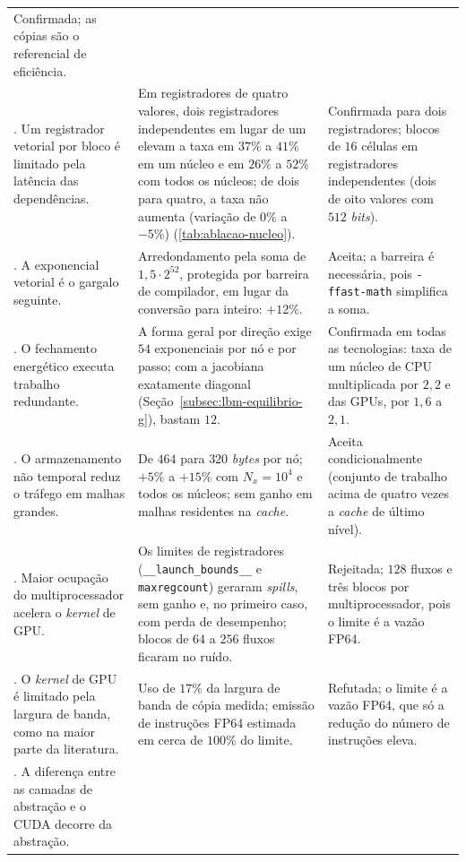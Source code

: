 \begin{longtable}{>{\raggedright\arraybackslash}p{3.2cm}>{\raggedright\arraybackslash}p{7.6cm}>{\raggedright\arraybackslash}p{4.3cm}}
        Confirmada; as cópias são o referencial de eficiência. \\
    6. Um registrador vetorial por bloco é limitado pela latência das dependências. &
        Em registradores de quatro valores, dois registradores independentes em lugar de um elevam a taxa em $37\%$ a $41\%$ em um núcleo e em $26\%$ a $52\%$ com todos os núcleos; de dois para quatro, a taxa não aumenta (variação de $0\%$ a $-5\%$) (\autoref{tab:ablacao-nucleo}). &
        Confirmada para dois registradores; blocos de $16$ células em registradores independentes (dois de oito valores com $512$ \textit{bits}). \\
    7. A exponencial vetorial é o gargalo seguinte. &
        Arredondamento pela soma de $1{,}5 \cdot 2^{52}$, protegida por barreira de compilador, em lugar da conversão para inteiro: $+12\%$. &
        Aceita; a barreira é necessária, pois \texttt{-ffast-math} simplifica a soma. \\
    8. O fechamento energético executa trabalho redundante. &
        A forma geral por direção exige $54$ exponenciais por nó e por passo; com a jacobiana exatamente diagonal (Seção~\ref{subsec:lbm-equilibrio-g}), bastam $12$. &
        Confirmada em todas as tecnologias: taxa de um núcleo de CPU multiplicada por $2{,}2$ e das GPUs, por $1{,}6$ a $2{,}1$. \\
    9. O armazenamento não temporal reduz o tráfego em malhas grandes. &
        De $464$ para $320$ \textit{bytes} por nó; $+5\%$ a $+15\%$ com $N_x = 10^4$ e todos os núcleos; sem ganho em malhas residentes na \textit{cache}. &
        Aceita condicionalmente (conjunto de trabalho acima de quatro vezes a \textit{cache} de último nível). \\
    10. Maior ocupação do multiprocessador acelera o \textit{kernel} de GPU. &
        Os limites de registradores (\texttt{\_\_launch\_bounds\_\_} e \texttt{maxregcount}) geraram \textit{spills}, sem ganho e, no primeiro caso, com perda de desempenho; blocos de $64$ a $256$ fluxos ficaram no ruído. &
        Rejeitada; $128$ fluxos e três blocos por multiprocessador, pois o limite é a vazão FP64. \\
    11. O \textit{kernel} de GPU é limitado pela largura de banda, como na maior parte da literatura. &
        Uso de $17\%$ da largura de banda de cópia medida; emissão de instruções FP64 estimada em cerca de $100\%$ do limite. &
        Refutada; o limite é a vazão FP64, que só a redução do número de instruções eleva. \\
    12. A diferença entre as camadas de abstração e o CUDA decorre da abstração. &

\end{longtable}

